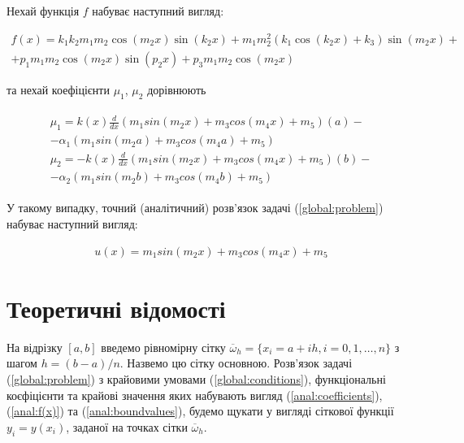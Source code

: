 Нехай функція $f$ набуває наступний вигляд:

\begin{equation}
\begin{multlined} \label{anal:f(x)}  
f(x) = k_1 k_2 m_1 m_2 \cos(m_2 x) \sin(k_2 x) + m_1 m_2^2 \left(k_1 \cos(k_2 x) + k_3 \right)\sin(m_2 x) + \\ + p_1 m_1 m_2 \cos(m_2 x) \sin(p_2 x) +
p_3 m_1 m_2 \cos(m_2 x)
\end{multlined}
\end{equation}

та нехай коефіцієнти $\mu_1$, $\mu_2$ дорівнюють

\begin{align}
\begin{split} \label{anal:boundvalues}
\mu_1 = k(x)\frac{d}{dx}\left(m_1 sin(m_2 x) + m_3 cos(m_4 x) + m_5 \right)(a) - \\ - \alpha_1 \left(m_1 sin(m_2 a) + m_3 cos(m_4 a) + m_5 \right) \\
\mu_2 = - k(x)\frac{d}{dx}\left(m_1 sin(m_2 x) + m_3 cos(m_4 x) + m_5 \right)(b) - \\ - \alpha_2 \left(m_1 sin(m_2 b) + m_3 cos(m_4 b) + m_5 \right)
\end{split}
\end{align}

У такому випадку, точний (аналітичний) розв'язок задачі (\ref{global:problem}) набуває наступний вигляд:

\begin{equation} \label{anal:solution}  
\begin{split}
u(x) = m_1 sin(m_2 x) + m_3 cos(m_4 x) + m_5
\end{split}					
\end{equation}


\section{Теоретичні відомості}

На відрізку $[a, b]$ введемо рівномірну сітку $\overline{\omega}_h = \{x_i = a + ih, i = 0, 1, \dots, n\}$ з шагом $h = {(b-a)}/{n}$. Назвемо цю сітку основною. Розв'язок задачі (\ref{global:problem}) з крайовими умовами (\ref{global:conditions}), функціональні коєфіцієнти та крайові значення яких набувають вигляд (\ref{anal:coefficients}), (\ref{anal:f(x)}) та (\ref{anal:boundvalues}), будемо щукати у вигляді сіткової функції \( y_i = y(x_i)\), заданої на точках сітки \(\overline{\omega}_h\).  

